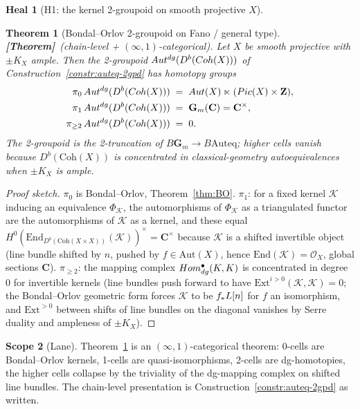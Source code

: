 \documentclass[11pt]{amsart}
\newtheorem{theorem}{Theorem}
\theoremstyle{definition}
\newtheorem{heal}[attack]{Heal}
\newtheorem{scope}[theorem]{Scope}
\providecommand{\Coh}{\mathrm{Coh}}
\providecommand{\Aut}{\mathrm{Aut}}
\providecommand{\Auteq}{\mathrm{Auteq}}
\providecommand{\Autdg}{\mathrm{Aut}^{\rm dg}}
\providecommand{\Pic}{\mathrm{Pic}}
\providecommand{\End}{\mathrm{End}}
\providecommand{\cO}{\mathcal{O}}
\providecommand{\cK}{\mathcal{K}}
\providecommand{\bC}{\mathbf{C}}
\providecommand{\bZ}{\mathbf{Z}}
\providecommand{\bG}{\mathbf{G}}
\providecommand{\ClaimStatusTheorem}{\textbf{[Theorem]}}
\begin{document}
\begin{heal}[H1: the kernel 2-groupoid on smooth projective $X$]
\begin{theorem}[Bondal--Orlov 2-groupoid on Fano / general type]
\label{thm:BO-2groupoid}
\ClaimStatusTheorem\ (chain-level + $(\infty,1)$-categorical). Let $X$
be smooth projective with $\pm K_X$ ample. Then the 2-groupoid
$\Autdg(D^b(\Coh(X)))$ of Construction~\ref{constr:auteq-2gpd} has
homotopy groups
\begin{align*}
 \pi_0\, \Autdg(D^b(\Coh(X))) \;&=\; \Aut(X) \ltimes (\Pic(X) \times \bZ),\\
 \pi_1\, \Autdg(D^b(\Coh(X))) \;&=\; \bG_m(\bC) = \bC^\times,\\
 \pi_{\geq 2}\, \Autdg(D^b(\Coh(X))) \;&=\; 0.
\end{align*}
The 2-groupoid is the 2-truncation of $B\bG_m \to B\Auteq$; higher
cells vanish because $D^b(\Coh(X))$ is \emph{concentrated in
classical-geometry autoequivalences} when $\pm K_X$ is ample.
\end{theorem}

\begin{proof}[Proof sketch]
$\pi_0$ is Bondal--Orlov, Theorem~\ref{thm:BO}. $\pi_1$: for a fixed
kernel $\cK$ inducing an equivalence $\Phi_{\cK}$, the automorphisms
of $\Phi_{\cK}$ as a triangulated functor are the automorphisms of
$\cK$ as a kernel, and these equal $H^0(\End_{D^b(\Coh(X\times X))}(\cK))^\times
= \bC^\times$ because $\cK$ is a shifted invertible object (line
bundle shifted by $n$, pushed by $f \in \Aut(X)$, hence
$\End(\cK) = \cO_X$, global sections $\bC$). $\pi_{\geq 2}$: the
mapping complex $\mathrm{Hom}^\bullet_{\rm dg}(\cK, \cK)$ is
concentrated in degree $0$ for invertible kernels (line bundles push
forward to have $\mathrm{Ext}^{i>0}(\cK, \cK) = 0$; the Bondal--Orlov
geometric form forces $\cK$ to be $f_* L[n]$ for $f$ an isomorphism,
and $\mathrm{Ext}^{> 0}$ between shifts of line bundles on the
diagonal vanishes by Serre duality and ampleness of $\pm K_X$).
\end{proof}

\begin{scope}[Lane]\label{scope:lane-BO}
Theorem~\ref{thm:BO-2groupoid} is an $(\infty,1)$-categorical
theorem: 0-cells are Bondal--Orlov kernels, 1-cells are
quasi-isomorphisms, 2-cells are dg-homotopies, the higher cells
collapse by the triviality of the dg-mapping complex on shifted
line bundles. The chain-level presentation is
Construction~\ref{constr:auteq-2gpd} as written.
\end{scope}
\end{heal}
\end{document}
